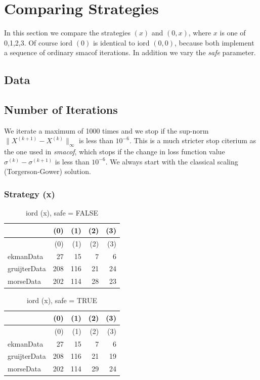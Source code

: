 \documentclass[
  12pt,
  letterpaper,
  DIV=11,
  numbers=noendperiod]{scrartcl}
\begin{document}
\section{Comparing Strategies}\label{comparing-strategies}

In this section we compare the strategies \((x)\) and \((0,x)\), where
\(x\) is one of 0,1,2,3. Of course iord \((0)\) is identical to iord
\((0,0)\), because both implement a sequence of ordinary smacof
iterations. In addition we vary the \emph{safe} parameter.

\subsection{Data}\label{data}

\subsection{Number of Iterations}\label{number-of-iterations}

We iterate a maximum of 1000 times and we stop if the sup-norm
\(\|X^{(k+1)} - X^{(k)}\|_\infty\) is less than \(10^{-6}\). This is a
much stricter stop citerium as the one used in \emph{smacof}, which
stops if the change in loss function value
\(\sigma^{(k)} - \sigma^{(k+1)}\) is less than \(10^{-6}\). We always
start with the classical scaling (Torgerson-Gower) solution.

\subsubsection{Strategy (x)}\label{strategy-x}

\begin{longtable}[]{@{}lrrrr@{}}
\caption{iord (x), safe = FALSE}\tabularnewline
\toprule\noalign{}
& (0) & (1) & (2) & (3) \\
\midrule\noalign{}
\endfirsthead
\toprule\noalign{}
& (0) & (1) & (2) & (3) \\
\midrule\noalign{}
\endhead
\bottomrule\noalign{}
\endlastfoot
ekmanData & 27 & 15 & 7 & 6 \\
gruijterData & 208 & 116 & 21 & 24 \\
morseData & 202 & 114 & 28 & 23 \\
\end{longtable}

\begin{longtable}[]{@{}lrrrr@{}}
\caption{iord (x), safe = TRUE}\tabularnewline
\toprule\noalign{}
& (0) & (1) & (2) & (3) \\
\midrule\noalign{}
\endfirsthead
\toprule\noalign{}
& (0) & (1) & (2) & (3) \\
\midrule\noalign{}
\endhead
\bottomrule\noalign{}
\endlastfoot
ekmanData & 27 & 15 & 7 & 6 \\
gruijterData & 208 & 116 & 21 & 19 \\
morseData & 202 & 114 & 29 & 24 \\
\end{longtable}
\end{document}
